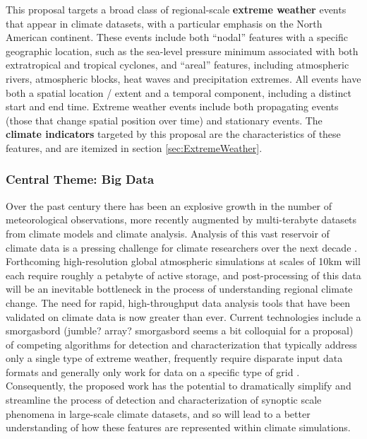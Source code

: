 \documentclass[11pt]{article}
\newcommand\citep{\cite}
\begin{document}
This proposal targets a broad class of regional-scale \textbf{extreme weather} events that appear in climate datasets, with a particular emphasis on the North American continent.  These events include both ``nodal'' features with a specific geographic location, such as the sea-level pressure minimum associated with both extratropical and tropical cyclones, and ``areal'' features, including atmospheric rivers, atmospheric blocks, heat waves and precipitation extremes.  All events have both a spatial location / extent and a temporal component, including a distinct start and end time.  Extreme weather events include both propagating events (those that change spatial position over time) and stationary events.  The \textbf{climate indicators} targeted by this proposal are the characteristics of these features, and are itemized in section \ref{sec:ExtremeWeather}.

\subsubsection{Central Theme: Big Data}

Over the past century there has been an explosive growth in the number of meteorological observations, more recently augmented by multi-terabyte datasets from climate models and climate analysis.  Analysis of this vast reservoir of climate data is a pressing challenge for climate researchers over the next decade \citep{levy2012bigdata, ganguly2008data}.  Forthcoming high-resolution global atmospheric simulations at scales of 10km will each require roughly a petabyte of active storage, and post-processing of this data will be an inevitable bottleneck in the process of understanding regional climate change.  The need for rapid, high-throughput data analysis tools that have been validated on climate data is now greater than ever.  Current technologies include a smorgasbord {\color{blue}(jumble? array? smorgasbord seems a bit colloquial for a proposal)} of competing algorithms for detection and characterization that typically address only a single type of extreme weather, frequently require disparate input data formats and generally only work for data on a specific type of grid \citep{neu2013imilast}.  Consequently, the proposed work has the potential to dramatically simplify and streamline the process of detection and characterization of synoptic scale phenomena in large-scale climate datasets, and so will lead to a better understanding of how these features are represented within climate simulations.
\end{document}
